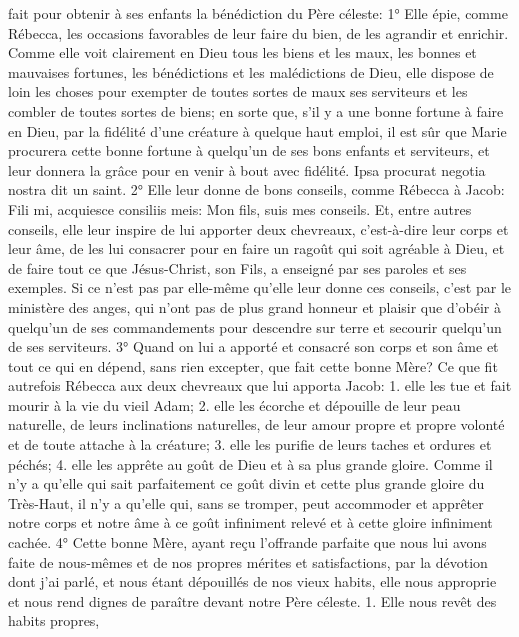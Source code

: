 fait pour obtenir à ses enfants la bénédiction du Père céleste:
 1° Elle épie, comme Rébecca, les occasions favorables de leur faire du bien, de les agrandir et enrichir.
Comme elle voit clairement en Dieu tous les biens et les maux, les bonnes et mauvaises fortunes, les bénédictions
et les malédictions de Dieu, elle dispose de loin les choses pour exempter de toutes sortes de maux ses serviteurs
et les combler de toutes sortes de biens; en sorte que, s'il y a une bonne fortune à faire en Dieu, par la fidélité
d'une créature à quelque haut emploi, il est sûr que Marie procurera cette bonne fortune à quelqu'un de ses bons
enfants et serviteurs, et leur donnera la grâce pour en venir à bout avec fidélité. Ipsa procurat negotia nostra dit un
saint.
 2° Elle leur donne de bons conseils, comme Rébecca à Jacob: Fili mi, acquiesce consiliis meis: Mon fils, suis
mes conseils. Et, entre autres conseils, elle leur inspire de lui apporter deux chevreaux, c'est-à-dire leur corps et
leur âme, de les lui consacrer pour en faire un ragoût qui soit agréable à Dieu, et de faire tout ce que Jésus-Christ,
son Fils, a enseigné par ses paroles et ses exemples. Si ce n'est pas par elle-même qu'elle leur donne ces
conseils, c'est par le ministère des anges, qui n'ont pas de plus grand honneur et plaisir que d'obéir à quelqu'un de
ses commandements pour descendre sur terre et secourir quelqu'un de ses serviteurs.
 3° Quand on lui a apporté et consacré son corps et son âme et tout ce qui en dépend, sans rien excepter,
que fait cette bonne Mère? Ce que fit autrefois Rébecca aux deux chevreaux que lui apporta Jacob: 1. elle les tue
et fait mourir à la vie du vieil Adam; 2. elle les écorche et dépouille de leur peau naturelle, de leurs inclinations
naturelles, de leur amour propre et propre volonté et de toute attache à la créature; 3. elle les purifie de leurs
taches et ordures et péchés; 4. elle les apprête au goût de Dieu et à sa plus grande gloire. Comme il n'y a qu'elle
qui sait parfaitement ce goût divin et cette plus grande gloire du Très-Haut, il n'y a qu'elle qui, sans se tromper,
peut accommoder et apprêter notre corps et notre âme à ce goût infiniment relevé et à cette gloire infiniment
cachée.
 4° Cette bonne Mère, ayant reçu l'offrande parfaite que nous lui avons faite de nous-mêmes et de nos
propres mérites et satisfactions, par la dévotion dont j'ai parlé, et nous étant dépouillés de nos vieux habits, elle
nous approprie et nous rend dignes de paraître devant notre Père céleste. 1. Elle nous revêt des habits propres,
